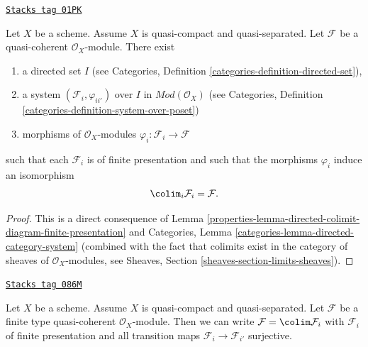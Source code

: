 \begin{lemma}
\label{properties-lemma-directed-colimit-finite-presentation}
\href{https://stacks.math.columbia.edu/tag/01PK}{\texttt{Stacks tag 01PK}}

Let $X$ be a scheme. Assume $X$ is quasi-compact and quasi-separated.
Let $\mathcal{F}$ be a quasi-coherent $\mathcal{O}_X$-module.
There exist
\begin{enumerate}
\item a directed set $I$ (see
Categories, Definition \ref{categories-definition-directed-set}),
\item a system $(\mathcal{F}_i, \varphi_{ii'})$
over $I$ in $\textit{Mod}(\mathcal{O}_X)$ (see
Categories, Definition \ref{categories-definition-system-over-poset})
\item morphisms of $\mathcal{O}_X$-modules
$\varphi_i : \mathcal{F}_i \to \mathcal{F}$
\end{enumerate}
such that each $\mathcal{F}_i$ is of finite presentation
and such that the morphisms $\varphi_i$ induce an isomorphism
$$
\colim_i \mathcal{F}_i
=
\mathcal{F}.
$$
\end{lemma}

\begin{proof}

This is a direct consequence of
Lemma \ref{properties-lemma-directed-colimit-diagram-finite-presentation} and
Categories, Lemma \ref{categories-lemma-directed-category-system}
(combined with the fact that
colimits exist in the category of sheaves of $\mathcal{O}_X$-modules, see
Sheaves, Section \ref{sheaves-section-limits-sheaves}).
\end{proof}

\begin{lemma}
\label{properties-lemma-finite-directed-colimit-surjective-maps}
\href{https://stacks.math.columbia.edu/tag/086M}{\texttt{Stacks tag 086M}}

Let $X$ be a scheme. Assume $X$ is quasi-compact and quasi-separated.
Let $\mathcal{F}$ be a finite type quasi-coherent $\mathcal{O}_X$-module.
Then we can write $\mathcal{F} = \colim \mathcal{F}_i$ with $\mathcal{F}_i$
of finite presentation and all transition maps
$\mathcal{F}_i \to \mathcal{F}_{i'}$ surjective.
\end{lemma}

